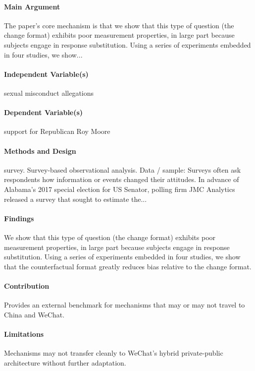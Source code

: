 \documentclass[12pt]{article}
\begin{document}
\paragraph{Main Argument} The paper's core mechanism is that we show that this type of question (the change format) exhibits poor measurement properties, in large part because subjects engage in response substitution. Using a series of experiments embedded in four studies, we show...

\paragraph{Independent Variable(s)} sexual misconduct allegations

\paragraph{Dependent Variable(s)} support for Republican Roy Moore

\paragraph{Methods and Design} survey. Survey-based observational analysis. Data / sample: Surveys often ask respondents how information or events changed their attitudes. In advance of Alabama's 2017 special election for US Senator, polling firm JMC Analytics released a survey that sought to estimate the...

\paragraph{Findings} We show that this type of question (the change format) exhibits poor measurement properties, in large part because subjects engage in response substitution. Using a series of experiments embedded in four studies, we show that the counterfactual format greatly reduces bias relative to the change format.

\paragraph{Contribution} Provides an external benchmark for mechanisms that may or may not travel to China and WeChat.

\paragraph{Limitations} Mechanisms may not transfer cleanly to WeChat's hybrid private-public architecture without further adaptation.
\end{document}

